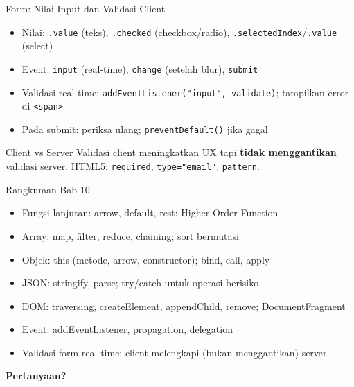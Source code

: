 \documentclass[handout]{beamer}
\begin{document}
\begin{frame}{Form: Nilai Input dan Validasi Client}
	\begin{itemize}
		\item Nilai: \texttt{.value} (teks), \texttt{.checked} (checkbox/radio), \texttt{.selectedIndex}/\texttt{.value} (select)
		\item Event: \texttt{input} (real-time), \texttt{change} (setelah blur), \texttt{submit}
		\item Validasi real-time: \texttt{addEventListener("input", validate)}; tampilkan error di \texttt{<span>}
		\item Pada submit: periksa ulang; \texttt{preventDefault()} jika gagal
	\end{itemize}
	\begin{block}{Client vs Server}
		Validasi client meningkatkan UX tapi \textbf{tidak menggantikan} validasi server. HTML5: \texttt{required}, \texttt{type="email"}, \texttt{pattern}.
	\end{block}
\end{frame}

\begin{frame}{Rangkuman Bab 10}
	\begin{itemize}
		\item Fungsi lanjutan: arrow, default, rest; Higher-Order Function
		\item Array: map, filter, reduce, chaining; sort bermutasi
		\item Objek: this (metode, arrow, constructor); bind, call, apply
		\item JSON: stringify, parse; try/catch untuk operasi berisiko
		\item DOM: traversing, createElement, appendChild, remove; DocumentFragment
		\item Event: addEventListener, propagation, delegation
		\item Validasi form real-time; client melengkapi (bukan menggantikan) server
	\end{itemize}
\end{frame}

\begin{frame}{}
	\centering
	\vfill
	\textbf{\Large Pertanyaan?}
	\vfill
\end{frame}
\end{document}
